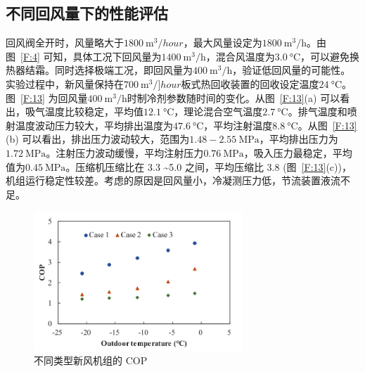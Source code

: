 \subsection{不同回风量下的性能评估}
回风阀全开时，风量略大于$\qty{1800}{\m^3/hour} $，最大风量设定为$\qty{1800}{\m^3/\hour}$。由图~\ref{F:4} 可知，具体工况下回风量为$\qty{1400}{\m^3/\hour} $，混合风温度为$\qty{3.0}{\degreeCelsius} $，可以避免换热器结霜。同时选择极端工况，即回风量为$\qty{400}{\m^3/\hour} $，验证低回风量的可能性。实验过程中，新风量保持在$\qty{700}{\m^3/]hour} $板式热回收装置的回收设定温度$\qty{24}{\degreeCelsius}$。图~\ref{F:13} 为回风量$\qty{400}{\m^3/\hour} $时制冷剂参数随时间的变化。从图~\ref{F:13}(a) 可以看出，吸气温度比较稳定，平均值$\qty{12.1}{\degreeCelsius} $，理论混合空气温度$\qty{2.7}{\degreeCelsius} $。排气温度和喷射温度波动压力较大，平均排出温度为$\qty{47.6}{\degreeCelsius} $，平均注射温度$\qty{8.8}{\degreeCelsius} $。从图~\ref{F:13}(b) 可以看出，排出压力波动较大，范围为$1.48 - \qty{2.55}{\MPa} $，平均排出压力为$\qty{1.72}{\MPa} $。注射压力波动缓慢，平均注射压力$\qty{0.76}{\MPa} $，吸入压力最稳定，平均值为$\qty{0.45}{\MPa} $。压缩机压缩比在 3.3 \textasciitilde 5.0 之间，平均压缩比 3.8 (图~\ref{F:13}(c))，机组运行稳定性较差。考虑的原因是回风量小，冷凝测压力低，节流装置液流不足。

\begin{figure}[htbp]
	\centering
	\includegraphics[width=0.7\textwidth]{figure/figure_12}
	\caption{不同类型新风机组的 COP}
	\label{F:12}
\end{figure}

